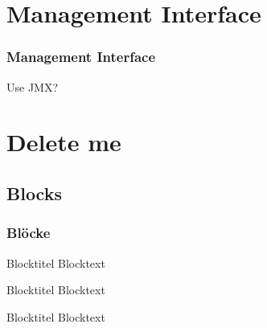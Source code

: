 \documentclass{beamer}
\begin{document}
\section{Management Interface}
\begin{frame}
\frametitle{Management Interface}
Use JMX?
\end{frame}











\section{Delete me}
\subsection{Blocks}
\begin{frame}
\frametitle{Bl\"ocke}

\begin{block}{Blocktitel}
Blocktext 
\end{block}

\begin{exampleblock}{Blocktitel}
Blocktext 
\end{exampleblock}


\begin{alertblock}{Blocktitel}
Blocktext 
\end{alertblock}
\end{frame}
\end{document}
